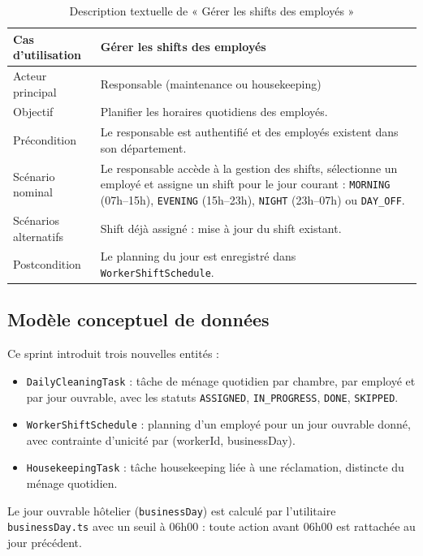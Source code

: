 \begin{table}[H]
\centering
\caption{Description textuelle de « Gérer les shifts des employés »}
\small
\begin{tabularx}{\textwidth}{|p{3.5cm}|X|}
\hline
Cas d'utilisation & Gérer les shifts des employés \\ \hline
Acteur principal & Responsable (maintenance ou housekeeping) \\ \hline
Objectif & Planifier les horaires quotidiens des employés. \\ \hline
Précondition & Le responsable est authentifié et des employés existent dans son département. \\ \hline
Scénario nominal & Le responsable accède à la gestion des shifts, sélectionne un employé et assigne un shift pour le jour courant : \texttt{MORNING} (07h--15h), \texttt{EVENING} (15h--23h), \texttt{NIGHT} (23h--07h) ou \texttt{DAY\_OFF}. \\ \hline
Scénarios alternatifs & Shift déjà assigné : mise à jour du shift existant. \\ \hline
Postcondition & Le planning du jour est enregistré dans \texttt{WorkerShiftSchedule}. \\ \hline
\end{tabularx}
\end{table}

\subsection{Modèle conceptuel de données}
Ce sprint introduit trois nouvelles entités :
\begin{itemize}
\item \texttt{DailyCleaningTask} : tâche de ménage quotidien par chambre, par employé et par jour ouvrable, avec les statuts \texttt{ASSIGNED}, \texttt{IN\_PROGRESS}, \texttt{DONE}, \texttt{SKIPPED}.
\item \texttt{WorkerShiftSchedule} : planning d'un employé pour un jour ouvrable donné, avec contrainte d'unicité par (workerId, businessDay).
\item \texttt{HousekeepingTask} : tâche housekeeping liée à une réclamation, distincte du ménage quotidien.
\end{itemize}

Le jour ouvrable hôtelier (\texttt{businessDay}) est calculé par l'utilitaire \texttt{businessDay.ts} avec un seuil à 06h00 : toute action avant 06h00 est rattachée au jour précédent.


